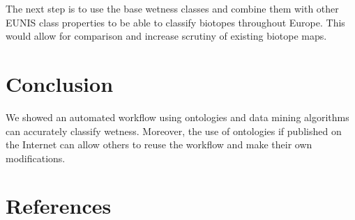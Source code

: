 \documentclass[authoryear, review,12pt,number]{elsarticle}
\begin{document}
The next step is to use the base wetness classes and combine them with other
EUNIS class properties to be able to classify biotopes throughout Europe. This
would allow for comparison and increase scrutiny of existing biotope maps.

\section{Conclusion}
We showed an automated workflow using ontologies and data mining algorithms can
accurately classify wetness. Moreover, the use of ontologies if published on the
Internet can allow others to reuse the workflow and make their own
modifications.

\section{References}

\end{document}
